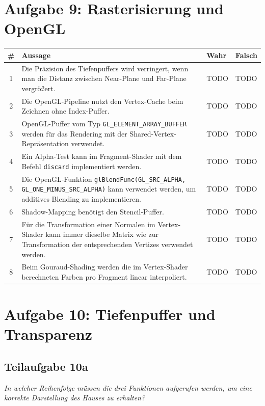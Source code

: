 \documentclass[a4paper]{scrartcl}
\begin{document}
\section*{Aufgabe 9: Rasterisierung und OpenGL}
\begin{table}[H]
    \begin{tabular}{cp{12cm}ll}
    \toprule
    \# & \textbf{Aussage} & \textbf{Wahr} & \textbf{Falsch} \\\midrule
    1  & Die Präzision des Tiefenpuffers wird verringert, wenn man die Distanz zwischen Near-Plane und Far-Plane vergrößert.                                    & TODO & TODO   \\
    2  & Die OpenGL-Pipeline nutzt den Vertex-Cache beim Zeichnen ohne Index-Puffer. & TODO & TODO   \\
    3  & OpenGL-Puffer vom Typ \texttt{GL\_ELEMENT\_ARRAY\_BUFFER} werden für das Rendering mit der Shared-Vertex-Repräsentation verwendet.                            & TODO & TODO   \\
    4  & Ein Alpha-Test kann im Fragment-Shader mit dem Befehl \texttt{discard} implementiert werden.                                                                    & TODO & TODO   \\
    5  & Die OpenGL-Funktion \texttt{glBlendFunc(GL\_SRC\_ALPHA, GL\_ONE\_MINUS\_SRC\_ALPHA)} kann verwendet werden, um additives Blending zu implementieren.           & TODO & TODO   \\
    6  & Shadow-Mapping benötigt den Stencil-Puffer.                                                                                                             & TODO & TODO   \\
    7  & Für die Transformation einer Normalen im Vertex-Shader kann immer dieselbe Matrix wie zur Transformation der entsprechenden Vertizes verwendet werden. & TODO & TODO   \\
    8  & Beim Gouraud-Shading werden die im Vertex-Shader berechneten Farben pro Fragment linear interpoliert.                                                   & TODO & TODO   \\\bottomrule
    \end{tabular}
\end{table}

\section*{Aufgabe 10: Tiefenpuffer und Transparenz}
\subsection*{Teilaufgabe 10a}
\textit{In welcher Reihenfolge müssen die drei Funktionen aufgerufen werden, um
eine korrekte Darstellung des Hauses zu erhalten?}
\end{document}
